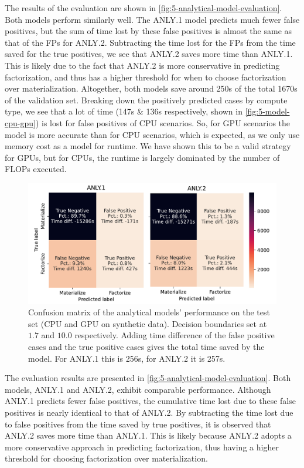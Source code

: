 The results of the evaluation are shown in \autoref{fig:5-analytical-model-evaluation}. Both models perform similarly well. The ANLY.1 model predicts much fewer false positives, but the sum of time lost by these false positives is almost the same as that of the FPs for ANLY.2. Subtracting the time lost for the FPs from the time saved for the true positives, we see that ANLY.2 saves more time than ANLY.1. This is likely due to the fact that ANLY.2 is more conservative in predicting factorization, and thus has a higher threshold for when to choose factorization over materialization. Altogether, both models save around 250s of the total 1670s of the validation set. Breaking down the positively predicted cases by compute type, we see that a lot of time (147s \& 136s respectively, shown in \autoref{fig:5-model-cpu-gpu}) is lost for false positives of CPU scenarios. So, for GPU scenarios the model is more accurate than for CPU scenarios, which is expected, as we only use memory cost as a model for runtime. We have shown this to be a valid strategy for GPUs, but for CPUs, the runtime is largely dominated by the number of FLOPs executed.

\begin{figure}[ht]
  \centering
  \includegraphics[width=0.9\linewidth]{chapters/05_cost_estimation/figures/analytical-models-compare.pdf}
  \caption[Analytical Model Confusion Matrix]{Confusion matrix of the analytical models' performance on the test set (CPU and GPU on synthetic data). Decision boundaries set at $1.7$ and $10.0$ respectively. Adding time difference of the false positive cases and the true positive cases gives the total time saved by the model. For ANLY.1 this is 256s, for ANLY.2 it is 257s. }
  \label{fig:5-analytical-model-evaluation}
\end{figure}

The evaluation results are presented in \autoref{fig:5-analytical-model-evaluation}. Both models, ANLY.1 and ANLY.2, exhibit comparable performance. Although ANLY.1 predicts fewer false positives, the cumulative time lost due to these false positives is nearly identical to that of ANLY.2. By subtracting the time lost due to false positives from the time saved by true positives, it is observed that ANLY.2 saves more time than ANLY.1. This is likely because ANLY.2 adopts a more conservative approach in predicting factorization, thus having a higher threshold for choosing factorization over materialization.


